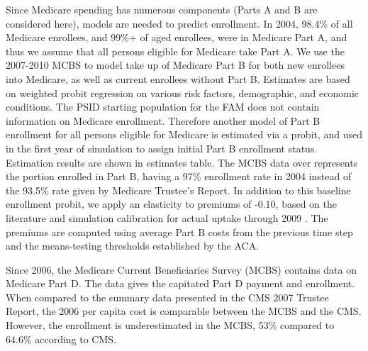 Since Medicare spending has numerous components (Parts A and B are considered here), models are needed to predict enrollment. In 2004, 
98.4\% of all Medicare enrollees, and 99\%+ of aged enrollees, were in Medicare Part A, and thus we assume that all persons eligible for 
Medicare take Part A. We use the 2007-2010 MCBS to model take up of Medicare Part B for both new enrollees into Medicare, as well as 
current enrollees without Part B. Estimates are based on weighted probit regression on various risk factors, demographic, and economic 
conditions. The PSID starting population for the FAM does not contain information on Medicare enrollment. Therefore another model of Part B 
enrollment for all persons eligible for Medicare is estimated via a probit, and used in the first year of simulation to assign initial Part 
B enrollment status. Estimation results are shown in estimates table. The MCBS data over represents the portion enrolled in Part B, having a 97\% 
enrollment rate in 2004 instead of the 93.5\% rate given by Medicare Trustee's Report. In addition to this baseline enrollment probit, we 
apply an elasticity to premiums of -0.10, based on the literature and simulation 
calibration for actual uptake through 2009 \citep{atherly2004effect,buchmueller2006price}. 
The premiums are computed using average Part B costs from the previous time step 
and the means-testing thresholds established by the ACA.


Since 2006, the Medicare Current Beneficiaries Survey (MCBS) contains data on Medicare Part D. The data gives the capitated Part D payment and 
enrollment. When compared to the summary data presented in the CMS 2007 Trustee Report, the 2006 per capita cost is comparable between the MCBS 
and the CMS. However, the enrollment is underestimated in the MCBS, 53\% compared to 64.6\% according to CMS. 

